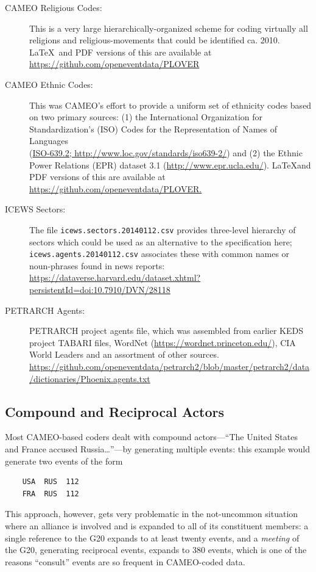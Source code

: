 \documentclass[11pt]{report}
\newcommand{\txt}[1]{\texttt{#1}}
\begin{document}
\begin{description}
\item[CAMEO Religious Codes:] This is a very large hierarchically-organized scheme for coding virtually all religions and religious-movements that could be identified ca. 2010. \LaTeX~and PDF versions of this are available at \url{https://github.com/openeventdata/PLOVER}
\item[CAMEO Ethnic Codes:] This was CAMEO's effort to provide a uniform set of ethnicity codes based on  two primary sources: (1) the International Organization for Standardization's (ISO) Codes for the Representation of Names of Languages\\ (\url{ISO-639.2; http://www.loc.gov/standards/iso639-2/}) and (2) the Ethnic Power Relations (EPR) dataset 3.1 (\url{http://www.epr.ucla.edu/}). \LaTeX and PDF versions of this are available at \url{https://github.com/openeventdata/PLOVER.}


\item[ICEWS Sectors:] The file \txt{icews.sectors.20140112.csv} provides three-level hierarchy of sectors which could be used as an alternative to the specification here; \txt{    
icews.agents.20140112.csv} associates these with common names or noun-phrases found in news reports:\\ \url{https://dataverse.harvard.edu/dataset.xhtml?persistentId=doi:10.7910/DVN/28118}

\item[PETRARCH Agents:] PETRARCH project agents file, which was assembled from earlier KEDS project TABARI files, WordNet (\url{https://wordnet.princeton.edu/}), CIA World Leaders and an assortment of other sources.\\ \url{https://github.com/openeventdata/petrarch2/blob/master/petrarch2/data/dictionaries/Phoenix.agents.txt}
\end{description}

\subsection{Compound and Reciprocal Actors}\label{sec:recip}

Most CAMEO-based coders dealt with compound actors---``The United States and France accused Russia\ldots''---by generating multiple events: this example would generate two events of the form
\begin{verbatim}
    USA  RUS  112
    FRA  RUS  112
\end{verbatim}
This approach, however, gets very problematic in the not-uncommon situation where an alliance is involved and is expanded to all of its constituent members: a single reference to the G20 expands to at least twenty events, and a \textit{meeting} of the G20, generating reciprocal events, expands to 380 events, which is one of the reasons ``consult'' events are so frequent in CAMEO-coded data.
\end{document}
